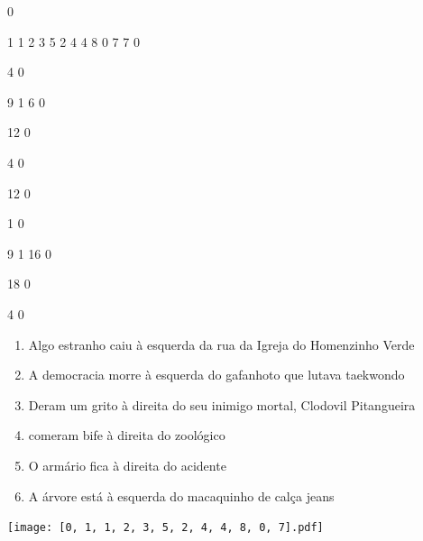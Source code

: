 \documentclass[12pt]{article}
\begin{document}
		\vfill  
		  
{
	0	%

	1	%
	1	%
	2	%
	3	%
	5	%
	2	%
	4	%
	4	%
	8	%
	0	%
	7	%
	7	%
	0	%

	4	%
	0	%

	9	%
	1	%
	6	%
	0	%

	12	%
	0	%

	4	%
	0	%

	12	%
	0	%

	1	%
	0	%

	9	%
	1	%
	16	%
	0	%

	18	%
	0	%

	4	%
	0	%

}	  
		    	

		 

\pagebreak


	\begin{enumerate}
		  \sffamily %
		  \large %


\vfill \item
Algo estranho caiu	%
à esquerda
da rua da Igreja do Homenzinho Verde	%

\vfill \item
A democracia morre	%
à esquerda
do gafanhoto que lutava taekwondo	%

\vfill \item
Deram um grito	%
à direita
do seu inimigo mortal, Clodovil Pitangueira	%

\vfill \item
comeram bife	%
à direita
do zoológico	%

\vfill \item
O armário fica	%
à direita
do acidente	%

\vfill \item
A árvore está	%
à esquerda
do macaquinho de calça jeans	%
	\end{enumerate}
		  
		  \hfill

		  \vfill

\texttt{[image: [0, 1, 1, 2, 3, 5, 2, 4, 4, 8, 0, 7].pdf]}


	\hfill	  	  
\end{document}
